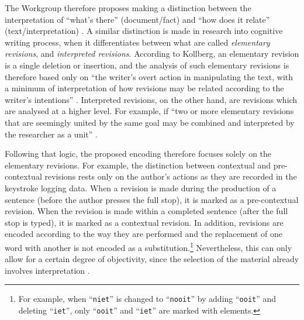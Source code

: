 \begin{paper}
\noindent 
The Workgroup therefore proposes making a
distinction between the interpretation of ``what's there''
(document/fact) and ``how does it relate'' (text/interpretation)
 \citep[§1.1]{the_tei_consortium_tei_2020}. A similar distinction is made in research into cognitive
writing process, when it differentiates between what are called \emph{elementary
revisions}, and \emph{interpreted revisions}. According to Kollberg, an elementary revision is a single
deletion or insertion, and the analysis of such elementary
revisions is therefore based only on ``the writer's overt action in
manipulating the text, with a minimum of interpretation of how revisions
may be related according to the writer's intentions'' \citep[16]{kollberg_s-notation_1998}. Interpreted revisions, on the other hand, are revisions which are
analysed at a higher level. For example, if ``two or more elementary
revisions that are seemingly united by the same goal may be combined and
interpreted by the researcher as a unit'' \citep[17]{kollberg_s-notation_1998}. 

Following that logic, the
proposed encoding therefore focuses solely on the elementary revisions.
For example, the distinction between contextual and pre-contextual
revisions rests only on the author's actions as they are recorded in the
keystroke logging data. When a revision is made during the production of
a sentence (before the author presses the full stop), it is marked as a
pre-contextual revision. When the revision is made within a completed
sentence (after the full stop is typed), it is marked as a contextual
revision. In addition, revisions are encoded according to the way they
are performed and the replacement of one word with another is not encoded
as a substitution.\footnote{For example, when ``\texttt{niet}'' is changed to ``\texttt{nooit}'' by adding ``\texttt{ooit}'' and deleting ``\texttt{iet}'', only ``\texttt{ooit}'' and ``\texttt{iet}'' are marked with elements.} Nevertheless, this can only allow for a certain degree
of objectivity, since the selection of the material already involves
interpretation \citep[38]{dillen_editor_2018}.


\end{paper}
